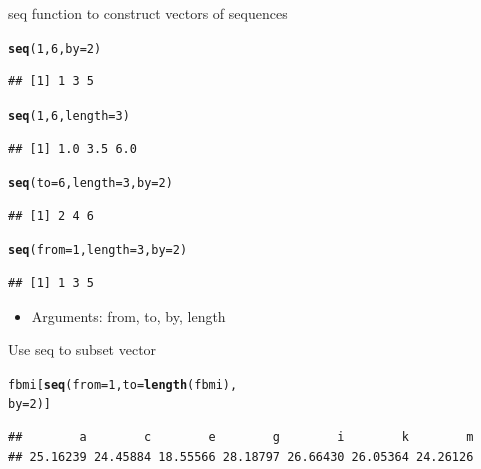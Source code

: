 \documentclass{beamer}\usepackage[]{graphicx}\usepackage[]{color}
\makeatletter
\newcommand{\hlnum}[1]{\textcolor[rgb]{0.686,0.059,0.569}{#1}}%
\newcommand{\hlstd}[1]{\textcolor[rgb]{0.345,0.345,0.345}{#1}}%
\newcommand{\hlkwc}[1]{\textcolor[rgb]{0.333,0.667,0.333}{#1}}%
\newcommand{\hlkwd}[1]{\textcolor[rgb]{0.737,0.353,0.396}{\textbf{#1}}}%
\newenvironment{kframe}{%
 \def\at@end@of@kframe{}%
 \ifinner\ifhmode%
  \def\at@end@of@kframe{\end{minipage}}%
  \begin{minipage}{\columnwidth}%
 \fi\fi%
 \def\FrameCommand##1{\hskip\@totalleftmargin \hskip-\fboxsep
 \colorbox{shadecolor}{##1}\hskip-\fboxsep
     \hskip-\linewidth \hskip-\@totalleftmargin \hskip\columnwidth}%
 \MakeFramed {\advance\hsize-\width
   \@totalleftmargin\z@ \linewidth\hsize
   \@setminipage}}%
 {\par\unskip\endMakeFramed%
 \at@end@of@kframe}
\newenvironment{knitrout}{}{} %
\renewenvironment{knitrout}{\begin{singlespace}}{\end{singlespace}}
\theoremstyle{mystyle}
\makeatother
\begin{document}
\begin{frame}[fragile]{seq function to construct vectors of sequences}
\begin{knitrout}
\color{fgcolor}\begin{kframe}
\begin{alltt}
\hlkwd{seq}\hlstd{(}\hlnum{1}\hlstd{,} \hlnum{6}\hlstd{,} \hlkwc{by} \hlstd{=} \hlnum{2}\hlstd{)}
\end{alltt}
\begin{verbatim}
## [1] 1 3 5
\end{verbatim}
\begin{alltt}
\hlkwd{seq}\hlstd{(}\hlnum{1}\hlstd{,} \hlnum{6}\hlstd{,} \hlkwc{length} \hlstd{=} \hlnum{3}\hlstd{)}
\end{alltt}
\begin{verbatim}
## [1] 1.0 3.5 6.0
\end{verbatim}
\begin{alltt}
\hlkwd{seq}\hlstd{(}\hlkwc{to} \hlstd{=} \hlnum{6}\hlstd{,} \hlkwc{length} \hlstd{=} \hlnum{3}\hlstd{,} \hlkwc{by} \hlstd{=} \hlnum{2}\hlstd{)}
\end{alltt}
\begin{verbatim}
## [1] 2 4 6
\end{verbatim}
\begin{alltt}
\hlkwd{seq}\hlstd{(}\hlkwc{from} \hlstd{=} \hlnum{1}\hlstd{,} \hlkwc{length} \hlstd{=} \hlnum{3}\hlstd{,} \hlkwc{by} \hlstd{=} \hlnum{2}\hlstd{)}
\end{alltt}
\begin{verbatim}
## [1] 1 3 5
\end{verbatim}
\end{kframe}
\end{knitrout}
\begin{itemize}
\item Arguments: from, to, by, length
\end{itemize}
\end{frame}

\begin{frame}[fragile]{Use seq to subset vector}
\begin{knitrout}
\color{fgcolor}\begin{kframe}
\begin{alltt}
\hlstd{fbmi[}\hlkwd{seq}\hlstd{(}\hlkwc{from} \hlstd{=} \hlnum{1}\hlstd{,} \hlkwc{to} \hlstd{=} \hlkwd{length}\hlstd{(fbmi),}
       \hlkwc{by} \hlstd{=} \hlnum{2}\hlstd{)]}
\end{alltt}
\begin{verbatim}
##        a        c        e        g        i        k        m 
## 25.16239 24.45884 18.55566 28.18797 26.66430 26.05364 24.26126
\end{verbatim}
\end{kframe}
\end{knitrout}
\end{frame}
\end{document}

